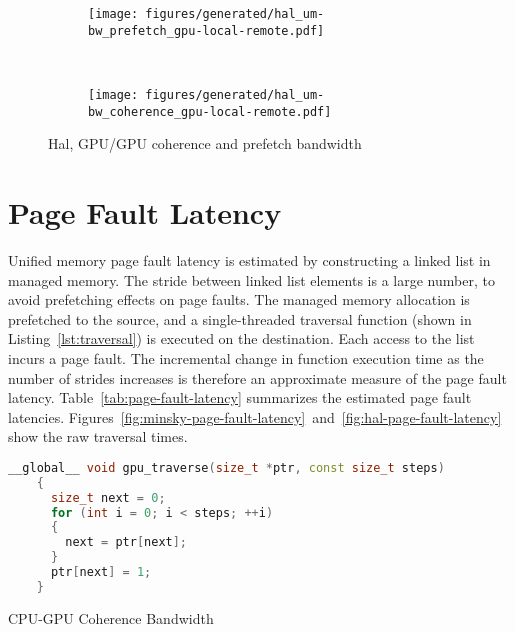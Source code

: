 \begin{figure}[ht]
    \centering
    \begin{subfigure}[b]{0.45\textwidth}
        \texttt{[image: figures/generated/hal\_um-bw\_prefetch\_gpu-local-remote.pdf]}
        \caption{}
        \label{}
    \end{subfigure}
    ~
    \begin{subfigure}[b]{0.45\textwidth}
        \texttt{[image: figures/generated/hal\_um-bw\_coherence\_gpu-local-remote.pdf]}
        \caption{}
        \label{}
    \end{subfigure}
    \caption[]{Hal, GPU/GPU coherence and prefetch bandwidth}
    \label{}
\end{figure}


\section{Page Fault Latency}

Unified memory page fault latency is estimated by constructing a linked list in managed memory.
The stride between linked list elements is a large number, to avoid prefetching effects on page faults.
The managed memory allocation is prefetched to the source, and a single-threaded traversal function (shown in Listing~\ref{lst:traversal}) is executed on the destination.
Each access to the list incurs a page fault.
The incremental change in function execution time as the number of strides increases is therefore an approximate measure of the page fault latency.
Table~\ref{tab:page-fault-latency} summarizes the estimated page fault latencies.
Figures~\ref{fig:minsky-page-fault-latency}~and~\ref{fig:hal-page-fault-latency} show the raw traversal times.

\begin{lstlisting}[language=c++, caption=Linked List Traversal, label=lst:traversal]
    __global__ void gpu_traverse(size_t *ptr, const size_t steps)
    {
      size_t next = 0;
      for (int i = 0; i < steps; ++i)
      {
        next = ptr[next];
      }
      ptr[next] = 1;
    }
\end{lstlisting}

\begin{algorithm}
    \caption{CPU-GPU Coherence Bandwidth}
    \label{alg:um-coherence-bw}
    \begin{algorithmic}[1]
    \Statex

    \EndFunction

    \end{algorithmic}
\end{algorithm}


